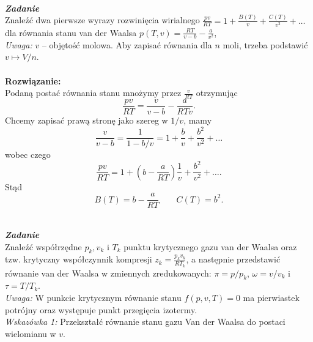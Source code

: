 \documentclass[11pt,a4paper]{article}
\newcounter{zadanie}\newcommand{\zadanie}[1][]{\addtocounter{zadanie}{1} ~\\  {\bf \emph{Zadanie \arabic{zadanie} #1 }} \\}
\begin{document}
\newpage
\zadanie
Znaleźć dwa pierwsze wyrazy rozwinięcia wirialnego 
$\displaystyle \frac{p v}{R T} = 1 + \frac{B(T)}{v} + \frac{C(T)}{v^2} + \ldots$ \\
dla równania stanu van der Waalsa
      $\displaystyle p(T,v) = \frac{R T}{v-b} - \frac{a}{v^2}$, \\
{\em Uwaga:} $v$ -- objętość molowa. 
Aby zapisać równania dla $n$ moli, trzeba podstawić $v \mapsto V/n$.\\
\\
\textbf{Rozwiązanie:}
\\
Podaną postać równania stanu mnożymy przez $\frac{v}{RT}$ otrzymując
\begin{equation*}
    \frac{pv}{RT}=\frac{v}{v-b}-\frac{a}{RTv}.
\end{equation*}
Chcemy zapisać prawą stronę jako szereg w $1/v$, mamy
\begin{equation*}
    \frac{v}{v-b}=\frac{1}{1-b/v}=1+\frac{b}{v}+\frac{b^2}{v^2}+\ldots
\end{equation*}
wobec czego
\begin{equation*}
    \frac{pv}{RT}=1+\left(b-\frac{a}{RT} \right) \frac{1}{v}+\frac{b^2}{v^2}+\ldots.
\end{equation*}
Stąd
\begin{equation*}
    B(T)=b-\frac{a}{RT} \qquad C(T)=b^2.
\end{equation*}


\newpage
\zadanie
Znaleźć współrzędne $p_k, v_k$ i $T_k$ punktu krytycznego
gazu van der Waalsa oraz tzw. krytyczny
współczynnik kompresji $\displaystyle z_k =\frac{p_k v_k}{R T_k}$,
a następnie przedstawić równanie van der Waalsa w
zmiennych zredukowanych: $\pi=p/p_k$, $\omega=v/v_k$ i $\tau=T/T_k$.\\

{\it Uwaga:} W punkcie krytycznym równanie stanu $f(p,v,T)=0$ ma pierwiastek potrójny oraz występuje punkt przegięcia izotermy.\\

{\it Wskazówka 1:} Przekształć równanie stanu gazu Van der Waalsa do postaci wielomianu w $v$.\\
\end{document}
